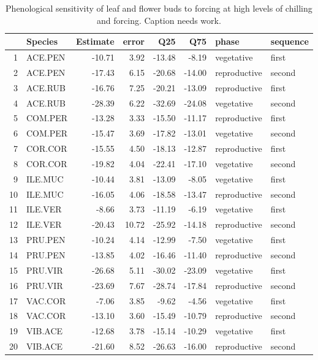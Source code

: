 \documentclass[11pt]{article}\usepackage[]{graphicx}\usepackage[]{color}
\begin{document}
\begin{table}[ht]
\centering
\begin{tabular}{rlrrrrll}
  \hline
 & Species & Estimate & error & Q25 & Q75 & phase & sequence \\ 
  \hline
1 & ACE.PEN & -10.71 & 3.92 & -13.48 & -8.19 & vegetative & first \\ 
  2 & ACE.PEN & -17.43 & 6.15 & -20.68 & -14.00 & reproductive & second \\ 
  3 & ACE.RUB & -16.76 & 7.25 & -20.21 & -13.09 & reproductive & first \\ 
  4 & ACE.RUB & -28.39 & 6.22 & -32.69 & -24.08 & vegetative & second \\ 
  5 & COM.PER & -13.28 & 3.33 & -15.50 & -11.17 & reproductive & first \\ 
  6 & COM.PER & -15.47 & 3.69 & -17.82 & -13.01 & vegetative & second \\ 
  7 & COR.COR & -15.55 & 4.50 & -18.13 & -12.87 & reproductive & first \\ 
  8 & COR.COR & -19.82 & 4.04 & -22.41 & -17.10 & vegetative & second \\ 
  9 & ILE.MUC & -10.44 & 3.81 & -13.09 & -8.05 & vegetative & first \\ 
  10 & ILE.MUC & -16.05 & 4.06 & -18.58 & -13.47 & reproductive & second \\ 
  11 & ILE.VER & -8.66 & 3.73 & -11.19 & -6.19 & vegetative & first \\ 
  12 & ILE.VER & -20.43 & 10.72 & -25.92 & -14.18 & reproductive & second \\ 
  13 & PRU.PEN & -10.24 & 4.14 & -12.99 & -7.50 & vegetative & first \\ 
  14 & PRU.PEN & -13.85 & 4.02 & -16.46 & -11.40 & reproductive & second \\ 
  15 & PRU.VIR & -26.68 & 5.11 & -30.02 & -23.09 & vegetative & first \\ 
  16 & PRU.VIR & -23.69 & 7.67 & -28.74 & -17.84 & reproductive & second \\ 
  17 & VAC.COR & -7.06 & 3.85 & -9.62 & -4.56 & vegetative & first \\ 
  18 & VAC.COR & -13.10 & 3.60 & -15.49 & -10.79 & reproductive & second \\ 
  19 & VIB.ACE & -12.68 & 3.78 & -15.14 & -10.29 & vegetative & first \\ 
  20 & VIB.ACE & -21.60 & 8.52 & -26.63 & -16.00 & reproductive & second \\ 
   \hline
\end{tabular}
\caption{Phenological sensitivity of leaf and flower buds to forcing at high levels of chilling and forcing. Caption needs work.} 
\label{tab:phh}
\end{table}
\end{document}
